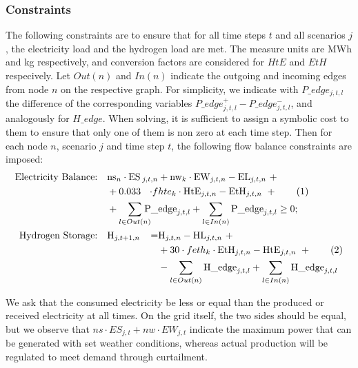 \subsubsection{Constraints}
The following constraints are to ensure that for all time steps $t$ and all scenarios $j$, the electricity load and the hydrogen load are met. 
The measure units are MWh and kg respectively, and conversion factors are considered for $HtE$ and $EtH$ respecively.
Let $Out(n)$ and $In(n)$ indicate the outgoing and incoming edges from node $n$ on the respective graph. 
For simplicity, we indicate with $P\_edge_{j,t,l}$ the difference of the corresponding variables $P\_edge^+_{j,t,l}-P\_edge^-_{j,t,l}$, and analogously for $H\_edge$. 
When solving, it is sufficient to assign a symbolic cost to them to ensure that only one of them is non zero at each time step. 
Then for each node $n$, scenario $j$ and time step $t$, the following flow balance constraints are imposed:
\begin{align*}
    \text{Electricity Balance:} \quad & \text{ns}_n \cdot \text{ES}\hspace{-1.2em}&_{j,t,n}&+ \text{nw}_k \cdot \text{EW}_{j,t,n} - \text{EL}_{j,t,n} \ + \\
    &  + 0.033\hspace{-2em}& \cdot f&hte_k \cdot \text{HtE}_{j,t,n} - \text{EtH}_{j,t,n}\ + \stepcounter{equation}\tag{\theequation}\label{constr_P}\\
    & + \sum_{l\in Out(n)}\hspace{-1.9em}&\text{P\_}&\text{edge}_{j,t,l} + \sum_{l\in In(n)} \text{P\_edge}_{j,t,l} \ge 0;\\
    \text{Hydrogen Storage:} \quad & \text{H}_{j,t+1,n} \hspace{-5em}&=& \text{H}_{j,t,n} - \text{HL}_{j,t,n}\ +\\ 
    &&& + 30 \cdot feth_k \cdot \text{EtH}_{j,t,n} - \text{HtE}_{j,t,n} \ + \stepcounter{equation}\tag{\theequation}\label{constr_H}\\
    &&& - \sum_{l\in Out(n)}\text{H\_edge}_{j,t,l} + \sum_{l\in In(n)}\text{H\_edge}_{j,t,l}
\end{align*}

We ask that the consumed electricity be less or equal than the produced or received electricity at all times. 
On the grid itself, the two sides should be equal, but we observe that $ns\cdot ES_{j,t} + nw\cdot EW_{j,t}$ indicate the maximum power that can be generated with set weather conditions, whereas actual production will be regulated to meet demand through curtailment. 

